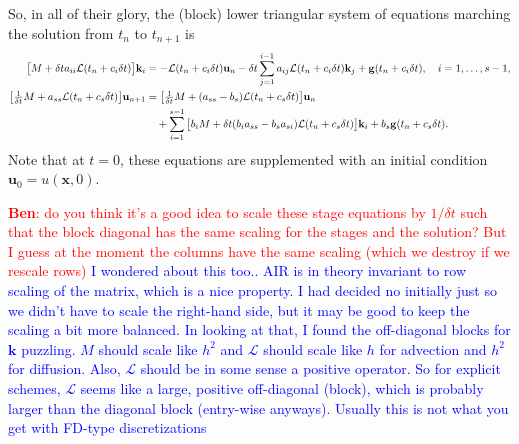 \documentclass[a4paper,10pt]{article}
\newcommand{\tcb}{\textcolor{blue}}
\begin{document}
So, in all of their glory, the (block) lower triangular system of equations marching the solution from $t_n$ to $t_{n+1}$ is
\begin{align} \label{eq:time_step_w_stages}
\begin{split}
\big[ M + \delta t a_{ii} {\cal L}(t_n + c_i \delta t) \big] \mathbf{k}_i 
&= 
- {\cal L}(t_n + c_i \delta t) \mathbf{u}_{n} 
- \delta t \sum \limits_{j = 1}^{i-1} a_{ij} {\cal L}(t_n + c_i \delta t) \mathbf{k}_{j} 
+ \mathbf{g}(t_n + c_i \delta t),
\quad
i = 1,\ldots,s-1, \\
\big[ 
\tfrac{1}{\delta t} M + a_{ss} {\cal L}(t_n + c_s \delta t) 
\big] 
\mathbf{u}_{n+1} 
&= 
\big[ 
\tfrac{1}{\delta t} M + ( a_{ss} - b_s) {\cal L}(t_n + c_s \delta t) 
\big] 
\mathbf{u}_{n} \\
&\quad
+ \sum \limits_{i = 1}^{s-1} 
\big[
b_i M + \delta t  (b_i a_{ss} - b_s a_{si}) {\cal L}(t_n + c_s \delta t)
\big] \mathbf{k}_i
+
b_s \mathbf{g}(t_n + c_s \delta t).
\end{split}
\end{align}
Note that at $t = 0$, these equations are supplemented with an initial condition $\mathbf{u}_0 = u(\mathbf{x},0)$.

\textcolor{red}{\textbf{Ben}: do you think it's a good idea to scale these stage equations by $1/\delta t$ such that the block diagonal has the same scaling for the stages and the solution? But I guess at the moment the columns have the same scaling (which we destroy if we rescale rows)}
\tcb{I wondered about this too.. AIR is in theory invariant to row scaling of the matrix, which is a nice property. I
had decided no initially just so we didn't have to scale the right-hand side, but it may be good to keep the scaling
a bit more balanced. 
In looking at that, I found the off-diagonal blocks for $\mathbf{k}$ puzzling. $M$ should scale like $h^2$ and 
$\mathcal{L}$ should scale like $h$ for advection and $h^2$ for diffusion. Also, $\mathcal{L}$ should be in some
sense a positive operator. So for explicit schemes, $\mathcal{L}$ seems like a large, positive off-diagonal (block), which is
probably larger than the diagonal block (entry-wise anyways). Usually this is not what you get with FD-type
discretizations}





\end{document}
